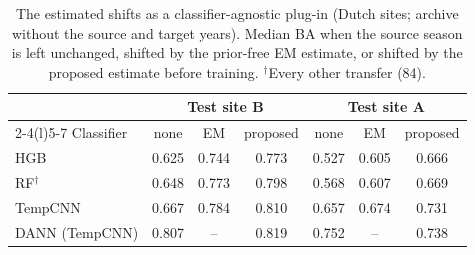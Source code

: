 \begin{table}[!t]
\caption{The estimated shifts as a classifier-agnostic plug-in (Dutch sites; archive without the source and target years). Median BA when the source season is left unchanged, shifted by the prior-free EM estimate, or shifted by the proposed estimate before training. $^{\dagger}$Every other transfer (84).}
\label{tab:plugin}
\centering\footnotesize
\begin{tabular}{@{}lcccccc@{}}
\toprule
 & \multicolumn{3}{c}{Test site B} & \multicolumn{3}{c}{Test site A}\\
\cmidrule(lr){2-4}\cmidrule(l){5-7}
Classifier & none & EM & proposed & none & EM & proposed\\
\midrule
HGB & 0.625 & 0.744 & 0.773 & 0.527 & 0.605 & 0.666\\
RF$^{\dagger}$ & 0.648 & 0.773 & 0.798 & 0.568 & 0.607 & 0.669\\
TempCNN & 0.667 & 0.784 & 0.810 & 0.657 & 0.674 & 0.731\\
DANN (TempCNN) & 0.807 & -- & 0.819 & 0.752 & -- & 0.738\\
\bottomrule
\end{tabular}
\end{table}
